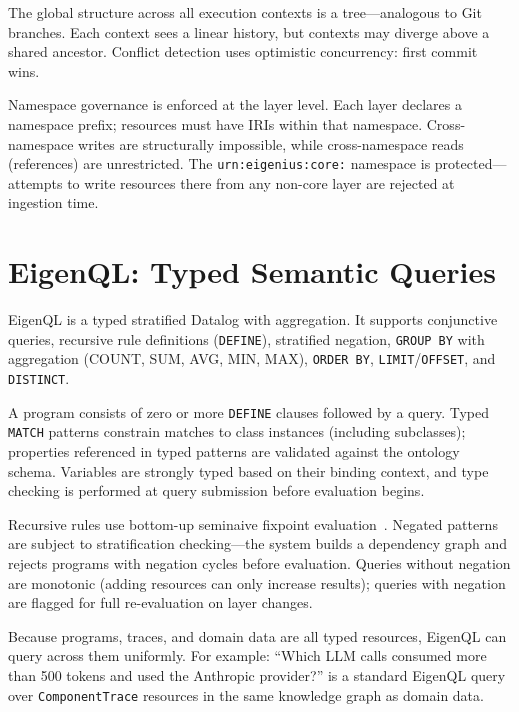 \documentclass[10pt,twocolumn,letterpaper]{article}
\newcommand{\code}[1]{\texttt{\small #1}}
\begin{document}
The global structure across all execution contexts is a tree---analogous to Git branches.
Each context sees a linear history, but contexts may diverge above a shared ancestor.
Conflict detection uses optimistic concurrency: first commit wins.

Namespace governance is enforced at the layer level.
Each layer declares a namespace prefix; resources must have IRIs within that namespace.
Cross-namespace writes are structurally impossible, while cross-namespace reads (references) are unrestricted.
The \code{urn:eigenius:core:} namespace is protected---attempts to write resources there from any non-core layer are rejected at ingestion time.


\section{EigenQL: Typed Semantic Queries}
\label{sec:eigenql}

EigenQL is a typed stratified Datalog with aggregation.
It supports conjunctive queries, recursive rule definitions (\code{DEFINE}), stratified negation, \code{GROUP BY} with aggregation (COUNT, SUM, AVG, MIN, MAX), \code{ORDER BY}, \code{LIMIT}/\code{OFFSET}, and \code{DISTINCT}.

A program consists of zero or more \code{DEFINE} clauses followed by a query.
Typed \code{MATCH} patterns constrain matches to class instances (including subclasses); properties referenced in typed patterns are validated against the ontology schema.
Variables are strongly typed based on their binding context, and type checking is performed at query submission before evaluation begins.

Recursive rules use bottom-up seminaive fixpoint evaluation~\cite{alice}.
Negated patterns are subject to stratification checking---the system builds a dependency graph and rejects programs with negation cycles before evaluation.
Queries without negation are monotonic (adding resources can only increase results); queries with negation are flagged for full re-evaluation on layer changes.

Because programs, traces, and domain data are all typed resources, EigenQL can query across them uniformly.
For example: ``Which LLM calls consumed more than 500 tokens and used the Anthropic provider?'' is a standard EigenQL query over \code{ComponentTrace} resources in the same knowledge graph as domain data.


\end{document}
